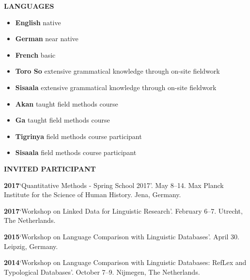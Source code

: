 \documentclass[11pt]{article}
\newcommand{\hangpara}{
 \setlength{\parindent}{0in} %
 \hangindent=0.42in %
}
\begin{document}
\vskip 10pt
\begin{flushleft}
{\bf LANGUAGES}
\end{flushleft}
\begin{itemize}
\item {\bf English} native
\item {\bf German} near native %
\item {\bf French} basic
\item {\bf Toro So} extensive grammatical knowledge through on-site fieldwork
\item {\bf Sisaala} extensive grammatical knowledge through on-site fieldwork
\item {\bf Akan} taught field methods course
\item {\bf Ga} taught field methods course
\item {\bf Tigrinya} field methods course participant
\item {\bf Sisaala} field methods course participant
\end{itemize}






\newpage

\vskip 10pt
\begin{flushleft}
{\bf INVITED PARTICIPANT}
\end{flushleft}

\hangpara
{\bf 2017}\hspace{1ex}`Quantitative Methods - Spring School 2017'. May 8--14. Max Planck Institute for the Science of Human History. Jena, Germany.

\hangpara
\vskip 6pt
{\bf 2017}\hspace{1ex}`Workshop on Linked Data for Linguistic Research'. February 6--7. Utrecht, The Netherlands.

\hangpara
\vskip 6pt
{\bf 2015}\hspace{1ex}`Workshop on Language Comparison with Linguistic Databases'. April 30. Leipzig, Germany.

\hangpara
\vskip 6pt
{\bf 2014}\hspace{1ex}`Workshop on Language Comparison with Linguistic Databases: RefLex and Typological Databases'. October 7--9. Nijmegen, The Netherlands.
\end{document}
